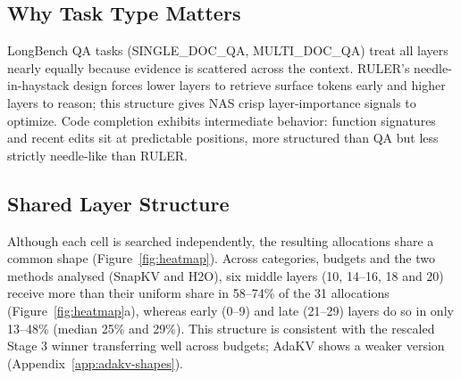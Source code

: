 \documentclass[11pt]{article}
\begin{document}


\subsection{Why Task Type Matters}

LongBench QA tasks (SINGLE\_DOC\_QA, MULTI\_DOC\_QA) treat all layers nearly equally because evidence is scattered across the context. RULER's needle-in-haystack design forces lower layers to retrieve surface tokens early and higher layers to reason; this structure gives NAS crisp layer-importance signals to optimize. Code completion exhibits intermediate behavior: function signatures and recent edits sit at predictable positions, more structured than QA but less strictly needle-like than RULER.

\subsection{Shared Layer Structure}

Although each cell is searched independently, the resulting allocations share a common shape (Figure~\ref{fig:heatmap}). Across categories, budgets and the two methods analysed (SnapKV and H2O), six middle layers (10, 14--16, 18 and 20) receive more than their uniform share in 58--74\% of the 31 allocations (Figure~\ref{fig:heatmap}a), whereas early (0--9) and late (21--29) layers do so in only 13--48\% (median 25\% and 29\%). This structure is consistent with the rescaled Stage 3 winner transferring well across budgets; AdaKV shows a weaker version (Appendix~\ref{app:adakv-shapes}).
\end{document}
